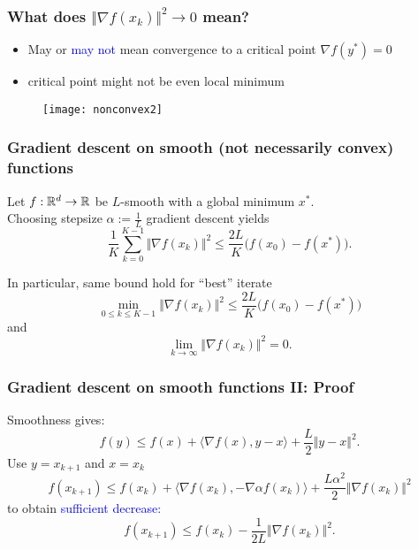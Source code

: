 \documentclass[aspectratio=149]{beamer}
\begin{document}
\begin{frame}
  \frametitle{What does $\Vert \nabla f(x_k) \Vert^2\to 0$ mean?}

  \begin{itemize}
    \item May or \textcolor{blue}{may not} mean convergence to a critical point $\nabla f(y^*) =0$
    \item critical point might not be even local minimum
  \end{itemize}

  \begin{figure}[ht]
    \centering
    \texttt{[image: nonconvex2]}
    \caption{\label{fig:label} }
  \end{figure}
\end{frame}


\begin{frame}
  \frametitle{Gradient descent on smooth (not necessarily convex) functions}

  \begin{theorem}
    Let $f : \mathbb{R}^d \to \mathbb{R}$ be $L$-smooth with a global minimum $x^*$. \\
    Choosing stepsize $\alpha := \frac{1}{L}$ gradient descent yields
    \begin{equation}
      \frac{1}{K} \sum_{k=0}^{K-1} \Vert \nabla f(x_k) \Vert^2 \le \frac{2L}{K} \big(f(x_0) - f(x^*)\big).
    \end{equation}
  \end{theorem}
  In particular, same bound hold for ``best'' iterate
  \begin{equation}
    \min_{0\le k \le K-1} \Vert \nabla f(x_k) \Vert^2 \le \frac{2L}{K} \big(f(x_0)-f(x^*)\big)
  \end{equation}
  and
  \begin{equation}
    \lim_{k \to \infty} \Vert \nabla f(x_k) \Vert^2 = 0.
  \end{equation}
\end{frame}


\begin{frame}
  \frametitle{Gradient descent on smooth  functions II: Proof}

  Smoothness gives:
  \begin{equation}
    f(y) \le f(x) + \langle \nabla f(x), y- x \rangle + \frac{L}{2} \Vert y-x \Vert^2.
  \end{equation}
  Use $y=x_{k+1}$ and $x=x_k$
  \begin{equation}
    f(x_{k+1}) \le f(x_k) + \langle \nabla f(x_k), - \nabla \alpha f(x_k) \rangle + \frac{L \alpha^2}{2} \Vert \nabla f(x_k) \Vert^2
  \end{equation}
  to obtain \textcolor{blue}{sufficient decrease:}
  \begin{equation}
    f(x_{k+1}) \le f(x_k) - \frac{1}{2L} \Vert \nabla f(x_k) \Vert^2.
  \end{equation}
\end{frame}
\end{document}
